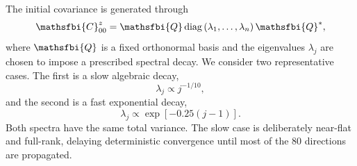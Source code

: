 The initial covariance is generated through
\begin{equation}
  \mathsfbi{C}_{00}^{z}
  =
  \mathsfbi{Q}
  \operatorname{diag}
  \left(
    \lambda_1,\dots,\lambda_n
  \right)
  \mathsfbi{Q}^{*},
  \label{eq:GL_covariance_construction_sste_necessity}
\end{equation}
where \(\mathsfbi{Q}\) is a fixed orthonormal basis and the eigenvalues \(\lambda_j\) are chosen to impose a prescribed spectral decay. We consider two representative cases. The first is a slow algebraic decay,
\begin{equation}
  \lambda_j
  \propto
  j^{-1/10},
  \label{eq:GL_slow_covariance_decay}
\end{equation}
and the second is a fast exponential decay,
\begin{equation}
  \lambda_j
  \propto
  \exp
  \left[
    -0.25(j-1)
  \right].
  \label{eq:GL_fast_covariance_decay}
\end{equation}
Both spectra have the same total variance. The slow case is deliberately near-flat and full-rank, delaying deterministic convergence until most of the 80 directions are propagated.
